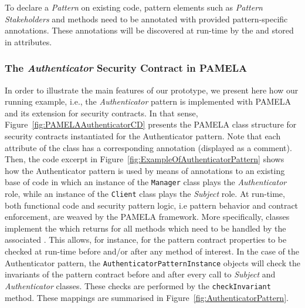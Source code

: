 To declare a \emph{Pattern} on existing code, pattern elements such as \emph{Pattern Stakeholders} and methods need to be annotated with provided pattern-specific  annotations. These annotations will be discovered at run-time by the  and stored in  attributes.



\subsubsection{The \textit{Authenticator} Security Contract in PAMELA}
\label{subsec:AuthenticatorSecurityContract}

In order to illustrate the main features of our prototype, we present here how our running example, i.e., the \emph{Authenticator} pattern is implemented with PAMELA and its extension for security contracts. In that sense, Figure~\ref{fig:PAMELAAuthenticatorCD} presents the PAMELA class structure for security contracts instantiated for the  Authenticator pattern. Note that each attribute of the  class has a corresponding annotation (displayed as a comment). Then, the code excerpt in Figure~\ref{fig:ExampleOfAuthenticatorPattern} shows how the Authenticator pattern is used by means of annotations to an existing base of code in which an instance of the \texttt{Manager} class plays the \emph{Authenticator} role, while an instance of the \texttt{Client} class plays the \emph{Subject} role. At run-time, both functional code and security pattern logic, i.e pattern behavior and contract enforcement, are weaved by the PAMELA framework. 
More specifically,  classes implement the  which returns  for all methods which need to be handled by the associated . This allows, for instance, for the pattern contract properties to be checked at run-time before and/or after any method of interest. In the case of the Authenticator pattern, the \texttt{AuthenticatorPatternInstance} objects will check the invariants of the pattern contract before and after every call to \emph{Subject} and \emph{Authenticator} classes. These checks are performed by the \texttt{checkInvariant} method. These mappings are summarised in Figure~\ref{fig:AuthenticatorPattern}. 

